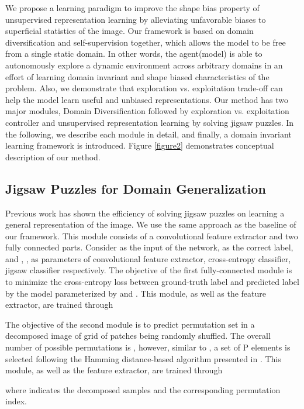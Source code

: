 \documentclass[10pt,twocolumn,letterpaper]{article}
\begin{document}
We propose a learning paradigm to improve the shape bias property of unsupervised representation learning by alleviating unfavorable biases to superficial statistics of the image.
Our framework is based on domain diversification and self-supervision together, which allows the model to be free from a single static domain. In other words, the agent(model) is able to autonomously explore a dynamic environment across arbitrary domains in an effort of learning domain invariant and shape biased characteristics of the problem.
Also, we demonstrate that exploration vs. exploitation trade-off can help the model learn useful and unbiased representations.
Our method has two major modules, Domain Diversification followed by exploration vs. exploitation controller and unsupervised representation learning by solving jigsaw puzzles. In the following, we describe each module in detail, and finally, a domain invariant learning framework is introduced. Figure \ref{figure2} demonstrates conceptual description of our method.

\subsection{Jigsaw Puzzles for Domain Generalization}
Previous work \cite{carlucci2019domain} has shown the efficiency of solving jigsaw puzzles on learning a general representation of the image. We use the same approach as the baseline of our framework.
This module consists of a convolutional feature extractor and two fully connected parts.
Consider  as the input of the network,  as the correct label, and , ,  as parameters of convolutional feature extractor, cross-entropy classifier, jigsaw classifier respectively.
The objective of the first fully-connected module is to minimize the cross-entropy loss between ground-truth label  and predicted label by the model parameterized by  and . This module, as well as the feature extractor, are trained through


The objective of the second module is to predict permutation set in a decomposed image of  grid of patches being randomly shuffled. The overall number of possible permutations is , however, similar to \cite{carlucci2019domain}, a set of P elements is selected following the Hamming distance-based algorithm presented in \cite{noroozi2016unsupervised}. This module, as well as the feature extractor, are trained through

where  indicates the decomposed samples and  the corresponding permutation index.
\end{document}
